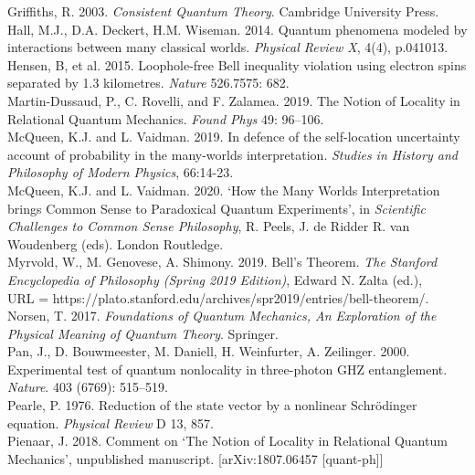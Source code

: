\documentclass[12pt]{article}
\begin{document}
Griffiths, R. 2003. \textit{Consistent Quantum Theory}. Cambridge University Press.\\

Hall, M.J., D.A. Deckert, H.M. Wiseman. 2014. Quantum phenomena modeled by interactions between many classical worlds. \textit{Physical Review X}, 4(4), p.041013.\\

Hensen, B, et al. 2015. Loophole-free Bell inequality violation using electron spins separated by 1.3 kilometres. \textit{Nature} 526.7575: 682.\\

Martin-Dussaud, P., C. Rovelli, and F. Zalamea. 2019. The Notion of Locality in Relational Quantum Mechanics. \textit{Found Phys} 49: 96–106.\\

McQueen, K.J. and L. Vaidman. 2019.
In defence of the self-location uncertainty account of probability in the many-worlds interpretation.
\textit{Studies in History and Philosophy of Modern Physics}, 66:14-23.\\

McQueen, K.J. and L. Vaidman. 2020. `How the Many Worlds Interpretation brings Common Sense to Paradoxical Quantum Experiments', in \textit{Scientific Challenges to Common Sense Philosophy}, R. Peels, J. de Ridder R. van Woudenberg (eds). London Routledge.\\ 

Myrvold, W., M. Genovese, A. Shimony. 2019. Bell's Theorem. \textit{The Stanford Encyclopedia of Philosophy (Spring 2019 Edition)}, Edward N. Zalta (ed.),\\ URL = {https://plato.stanford.edu/archives/spr2019/entries/bell-theorem/}.\\

Norsen, T. 2017. \textit{Foundations of Quantum Mechanics, An Exploration of the Physical Meaning of Quantum Theory}. Springer.\\

Pan, J., D. Bouwmeester, M. Daniell, H. Weinfurter, A. Zeilinger. 2000. Experimental test of quantum nonlocality in three-photon GHZ entanglement. \textit{Nature}. 403 (6769): 515–519.\\

Pearle, P. 1976. Reduction of the state vector by a nonlinear Schr\"{o}dinger equation. \textit{Physical Review} D 13, 857.\\

Pienaar, J. 2018. Comment on `The Notion of Locality in Relational Quantum Mechanics', unpublished manuscript. [arXiv:1807.06457 [quant-ph]]\\
\end{document}
